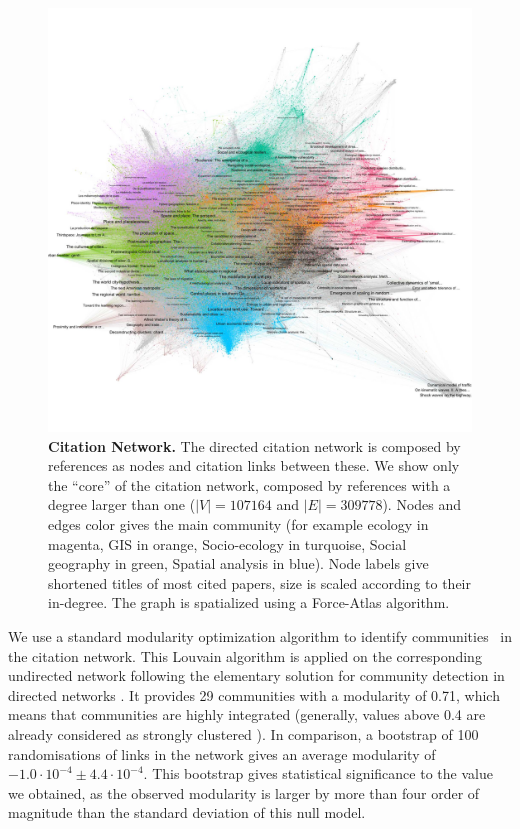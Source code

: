 \documentclass[10pt]{article}
\begin{document}
\begin{figure}
\includegraphics[width=\linewidth]{Fig5.jpg}
\caption{\textbf{Citation Network.} The directed citation network is composed by references as nodes and citation links between these. We show only the ``core'' of the citation network, composed by references with a degree larger than one ($\left|V\right| = 107164$ and $\left|E\right| = 309778$). Nodes and edges color gives the main community (for example ecology in magenta, GIS in orange, Socio-ecology in turquoise, Social geography in green, Spatial analysis in blue). Node labels give shortened titles of most cited papers, size is scaled according to their in-degree. The graph is spatialized using a Force-Atlas algorithm.}
\label{fig:citnw}
\end{figure}



We use a standard modularity optimization algorithm to identify communities~\citep{blondel2008fast} in the citation network. This Louvain algorithm is applied on the corresponding undirected network following the elementary solution for community detection in directed networks \citep{malliaros2013clustering}. It provides 29 communities with a modularity of 0.71, which means that communities are highly integrated (generally, values above 0.4 are already considered as strongly clustered \citep{newman2006modularity}). In comparison, a bootstrap of 100 randomisations of links in the network gives an average modularity of $-1.0\cdot 10^{-4} \pm 4.4\cdot 10^{-4}$. This bootstrap gives statistical significance to the value we obtained, as the observed modularity is larger by more than four order of magnitude than the standard deviation of this null model.
\end{document}
